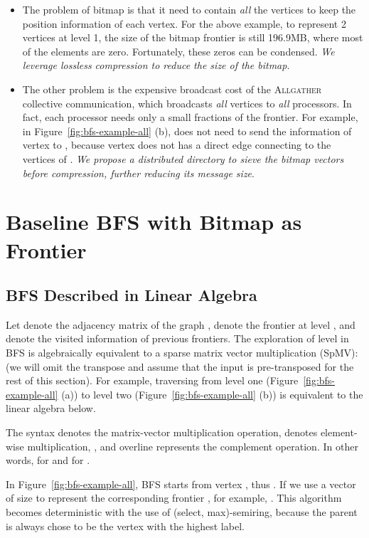 \documentclass[conference]{IEEEtran}
\begin{document}
\begin{itemize}
\item The problem of bitmap is that it need to contain \emph{all} the vertices
  to keep the position information of each vertex. For the above example, to
  represent 2 vertices at level 1, the size of the bitmap frontier is still
  196.9MB, where most of the elements are zero. Fortunately, these zeros can
  be condensed.  \emph{We leverage lossless compression to reduce the size of
    the bitmap}.
\item The other problem is the expensive broadcast cost of the
  \textsc{Allgather} collective communication, which broadcasts \emph{all}
  vertices to \emph{all} processors. In fact, each processor needs only a
  small fractions of the frontier.  For example, in
  Figure~\ref{fig:bfs-example-all} (b),  does not need to send the
  information of vertex  to , because vertex  does not has a direct
  edge connecting to the vertices of .  \emph{We propose a distributed
    directory to sieve the bitmap vectors before compression, further reducing
    its message size}.
\end{itemize}




\section{Baseline BFS with Bitmap as Frontier}
\label{sec:baseline-bfs}

\subsection{BFS Described in Linear Algebra}
\label{sec:preliminary}

Let  denote the adjacency matrix of the graph ,  denote the
frontier at level , and  denote the
visited information of previous frontiers. The exploration of level  in BFS
is algebraically equivalent to a sparse matrix vector multiplication (SpMV):
 (we will omit the
transpose and assume that the input is pre-transposed for the rest of this
section).
For example, traversing from level one (Figure~\ref{fig:bfs-example-all} (a))
to level two (Figure~\ref{fig:bfs-example-all} (b)) is equivalent to the
linear algebra below.

The syntax  denotes the
matrix-vector multiplication operation,  denotes element-wise
multiplication, , and overline represents the complement
operation. In other words,  for  and
 for .

In Figure~\ref{fig:bfs-example-all}, BFS
starts from vertex , thus . If we use a
vector of size  to represent the corresponding frontier , for
example, . This algorithm
becomes deterministic with the use of (select, max)-semiring, because the
parent is always chose to be the vertex with the highest label. 
\end{document}
